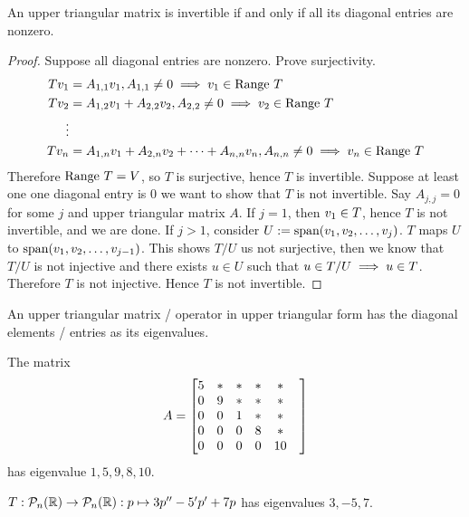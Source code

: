 \begin{theorem}
    An upper triangular matrix is invertible if and only if all its diagonal entries are nonzero.
\end{theorem}
\begin{proof}
    Suppose all diagonal entries are nonzero. Prove surjectivity. 
    \begin{align*}
        Tv_1  &=A_{1,1} v_1, A_{1,1} \neq 0 \implies v_1 \in \text{Range } T\\
     Tv_2  &=A_{1,2} v_1 + A_{2,2} v_2 , A_{2,2} \neq 0 \implies v_2 \in \text{Range } T \\
     \vdots \\
     Tv_n &= A_{1,n} v_1 + A_{2,n} v_2 + \cdots + A_{n,n} v_n, A_{n,n} \neq 0 \implies v_n \in \text{Range } T
    \end{align*} 
    Therefore $\text{Range } T = V$, so $T$ is surjective, hence $T$ is invertible. 
    Suppose at least one one diagonal entry is $0$ we want to show that $T$ is not invertible. Say $A_{j,j} = 0$ for some $j$ and upper triangular matrix $A$. If $j = 1$, then $v_1 \in \null T$, hence $T$ is not invertible, and we are done. If $j > 1$, consider $U := \text{span} ({v}_1,{v}_2, \ldots, {v}_{j})$. $T$ maps $U$ to $\text{span} ({v}_1,{v}_2, \ldots, {v}_{j-1})$. This shows $T/U$ us not surjective, then we know that $T/U$ is not injective and there exists $u \in U$ such that $u \in \null T/U \implies u \in \null T$. Therefore $T$ is not injective. Hence $T$ is not invertible.
\end{proof}
\begin{corollary}
    An upper triangular matrix / operator in upper triangular form has the diagonal elements / entries as its eigenvalues.
\end{corollary}
\begin{example}The matrix
    \[ A = \begin{bmatrix} 
5 & * & * & * & * & \\
0 & 9 & * & * & * & \\
0 & 0 & 1 & * & * & \\
0 & 0 & 0 & 8 & * & \\
0 & 0 & 0 & 0 & 10 & \\
\end{bmatrix}\]
has eigenvalue $1,5,9,8,10$.
\end{example}
\begin{example}
    $T: \mathcal P_n(\mathbb R) \to \mathcal P_n(\mathbb R) : p \mapsto 3p'' - 5'p' + 7p$ has eigenvalues $3,-5,7$.
\end{example}
